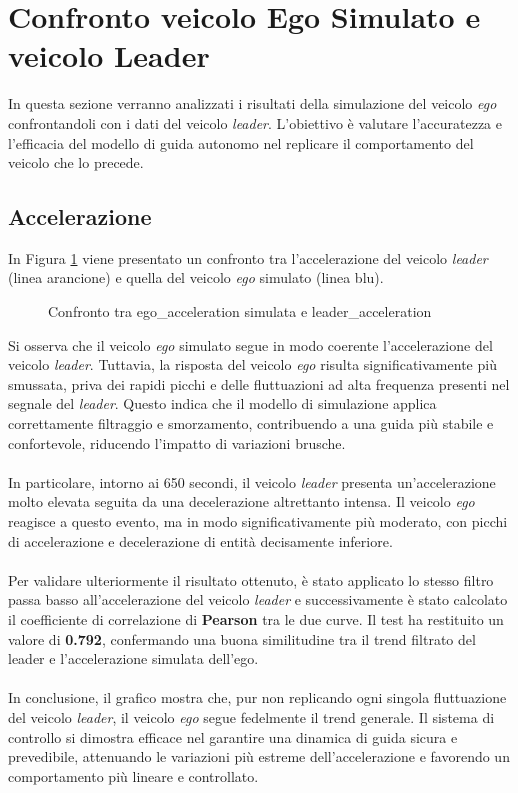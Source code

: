\section{Confronto veicolo Ego Simulato e veicolo Leader}
In questa sezione verranno analizzati i risultati della simulazione del veicolo \emph{ego} confrontandoli 
con i dati del veicolo \emph{leader}. L'obiettivo è valutare l'accuratezza e l'efficacia del modello di guida autonomo nel replicare 
il comportamento del veicolo che lo precede.
\subsection{Accelerazione}
In Figura \ref{fig:acc_leader_ego} viene presentato un confronto tra l'accelerazione del veicolo \emph{leader} 
(linea arancione) e quella del veicolo \emph{ego} simulato (linea blu).
\begin{figure}[H]
    \centering
    \caption{Confronto tra ego\_acceleration simulata e leader\_acceleration}
    \label{fig:acc_leader_ego}
\end{figure}
\noindent Si osserva che il veicolo \emph{ego} simulato segue in modo coerente l'accelerazione del veicolo \emph{leader}. Tuttavia, la 
risposta del veicolo \emph{ego} risulta significativamente più smussata, priva dei rapidi picchi e delle fluttuazioni ad alta frequenza 
presenti nel segnale del \emph{leader}. Questo indica che il modello di simulazione applica correttamente filtraggio e smorzamento, 
contribuendo a una guida più stabile e confortevole, riducendo l'impatto di variazioni brusche.
\\\\
\noindent In particolare, intorno ai 650 secondi, il veicolo \emph{leader} presenta un'accelerazione molto elevata seguita da una 
decelerazione altrettanto intensa. Il veicolo \emph{ego} reagisce a questo evento, ma in modo significativamente più moderato, 
con picchi di accelerazione e decelerazione di entità decisamente inferiore.
\\\\
\noindent Per validare ulteriormente il risultato ottenuto, è stato applicato lo stesso filtro passa basso all'accelerazione del veicolo 
\emph{leader} e successivamente è stato calcolato il coefficiente di correlazione di \textbf{Pearson} tra le due curve. Il test ha restituito un 
valore di \textbf{0.792}, confermando una buona similitudine tra il trend filtrato del leader e l'accelerazione simulata dell'ego.
\\\\
\noindent In conclusione, il grafico mostra che, pur non replicando ogni singola fluttuazione del veicolo \emph{leader}, 
il veicolo \emph{ego} segue fedelmente il trend generale. Il sistema di controllo si dimostra efficace nel garantire 
una dinamica di guida sicura e prevedibile, attenuando le variazioni più estreme dell'accelerazione e favorendo 
un comportamento più lineare e controllato.

